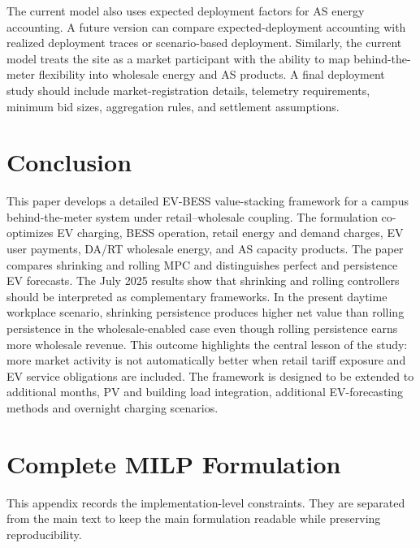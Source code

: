 \documentclass[final,5p,times]{elsarticle}
\begin{document}
The current model also uses expected deployment factors for AS energy accounting. A future version can compare expected-deployment accounting with realized deployment traces or scenario-based deployment. Similarly, the current model treats the site as a market participant with the ability to map behind-the-meter flexibility into wholesale energy and AS products. A final deployment study should include market-registration details, telemetry requirements, minimum bid sizes, aggregation rules, and settlement assumptions.

\section{Conclusion}
\label{sec:conclusion}

This paper develops a detailed EV-BESS value-stacking framework for a campus behind-the-meter system under retail--wholesale coupling. The formulation co-optimizes EV charging, BESS operation, retail energy and demand charges, EV user payments, DA/RT wholesale energy, and AS capacity products. The paper compares shrinking and rolling MPC and distinguishes perfect and persistence EV forecasts. The July 2025 results show that shrinking and rolling controllers should be interpreted as complementary frameworks. In the present daytime workplace scenario, shrinking persistence produces higher net value than rolling persistence in the wholesale-enabled case even though rolling persistence earns more wholesale revenue. This outcome highlights the central lesson of the study: more market activity is not automatically better when retail tariff exposure and EV service obligations are included. The framework is designed to be extended to additional months, PV and building load integration, additional EV-forecasting methods and overnight charging scenarios.

\appendix
\section{Complete MILP Formulation}
\label{app:complete_milp}

This appendix records the implementation-level constraints. They are separated from the main text to keep the main formulation readable while preserving reproducibility.
\end{document}
